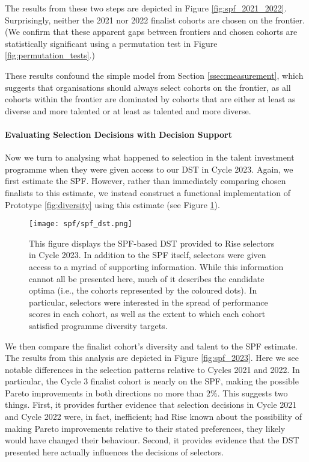 The results from these two steps are depicted in Figure \ref{fig:spf_2021_2022}. Surprisingly, neither the 2021 nor 2022 finalist cohorts are chosen on the frontier. (We confirm that these apparent gaps between frontiers and chosen cohorts are statistically significant using a permutation test in Figure \ref{fig:permutation_tests}.)

These results confound the simple model from Section \ref{ssec:measurement}, which suggests that organisations should always select cohorts on the frontier, as all cohorts within the frontier are dominated by cohorts that are either at least as diverse and more talented or at least as talented and more diverse.

\paragraph{Evaluating Selection Decisions with Decision Support}
Now we turn to analysing what happened to selection in the talent investment programme when they were given access to our DST in Cycle 2023. Again, we first estimate the SPF. However, rather than immediately comparing chosen finalists to this estimate, we instead construct a functional implementation of Prototype \ref{fig:diversity} using this estimate (see Figure \ref{fig:spf_dst}).

\begin{figure}[htbp]
    \centering
    \caption{This figure displays the SPF-based DST provided to Rise selectors in Cycle 2023. In addition to the SPF itself, selectors were given access to a myriad of supporting information. While this information cannot all be presented here, much of it describes the candidate optima (i.e., the cohorts represented by the coloured dots). In particular, selectors were interested in the spread of performance scores in each cohort, as well as the extent to which each cohort satisfied programme diversity targets.}
    \label{fig:spf_dst}
    \texttt{[image: spf/spf\_dst.png]} 
\end{figure}

\noindent We then compare the finalist cohort's diversity and talent to the SPF estimate. The results from this analysis are depicted in Figure \ref{fig:spf_2023}. Here we see notable differences in the selection patterns relative to Cycles 2021 and 2022. In particular, the Cycle 3 finalist cohort is nearly on the SPF, making the possible Pareto improvements in both directions no more than $2\%$. This suggests two things. First, it provides further evidence that selection decisions in Cycle 2021 and Cycle 2022 were, in fact, inefficient; had Rise known about the possibility of making Pareto improvements relative to their stated preferences, they likely would have changed their behaviour. Second, it provides evidence that the DST presented here actually influences the decisions of selectors. 


